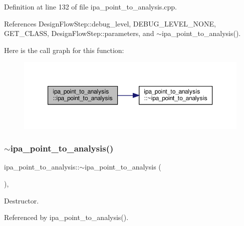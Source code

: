 Definition at line 132 of file ipa\+\_\+point\+\_\+to\+\_\+analysis.\+cpp.



References Design\+Flow\+Step\+::debug\+\_\+level, D\+E\+B\+U\+G\+\_\+\+L\+E\+V\+E\+L\+\_\+\+N\+O\+NE, G\+E\+T\+\_\+\+C\+L\+A\+SS, Design\+Flow\+Step\+::parameters, and $\sim$ipa\+\_\+point\+\_\+to\+\_\+analysis().

Here is the call graph for this function\+:
\nopagebreak
\begin{figure}[H]
\begin{center}
\leavevmode
\includegraphics[width=350pt]{d6/d2c/classipa__point__to__analysis_a288d3060b735d0e6cd1fd24623e7f1c9_cgraph}
\end{center}
\end{figure}
\mbox{\label{classipa__point__to__analysis_a9af2dcc2b52f329b11729242a076d9b5}} 
\subsubsection{\texorpdfstring{$\sim$ipa\+\_\+point\+\_\+to\+\_\+analysis()}{~ipa\_point\_to\_analysis()}}
{\footnotesize\ttfamily ipa\+\_\+point\+\_\+to\+\_\+analysis\+::$\sim$ipa\+\_\+point\+\_\+to\+\_\+analysis (\begin{DoxyParamCaption}{ }\end{DoxyParamCaption})\hspace{0.3cm}{\ttfamily [override]}, {\ttfamily [default]}}



Destructor. 



Referenced by ipa\+\_\+point\+\_\+to\+\_\+analysis().

